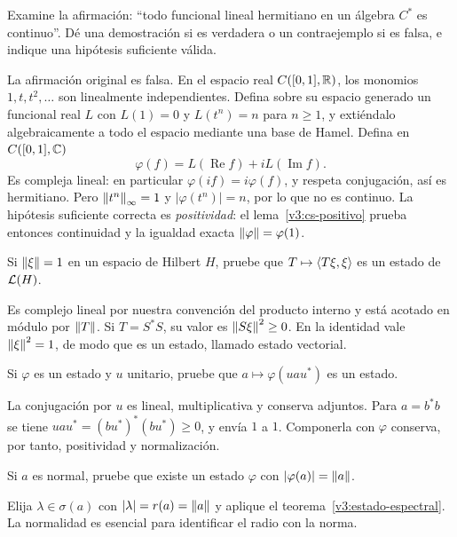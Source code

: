 \begin{ejercicio}\label{ej:v3-l28-1}
Examine la afirmación: ``todo funcional lineal hermitiano en un álgebra $C^*$ es continuo''. Dé una demostración si es verdadera o un contraejemplo si es falsa, e indique una hipótesis suficiente válida.
\end{ejercicio}
\begin{solucion}
La afirmación original es falsa. En el espacio real $C([0,1],\mathbb R)$, los monomios $1,t,t^2,\ldots$ son linealmente independientes. Defina sobre su espacio generado un funcional real $L$ con $L(1)=0$ y $L(t^n)=n$ para $n\ge1$, y extiéndalo algebraicamente a todo el espacio mediante una base de Hamel. Defina en $C([0,1],\mathbb C)$
\[
 \varphi(f)=L(\operatorname{Re}f)+iL(\operatorname{Im}f).
\]
Es compleja lineal: en particular $\varphi(if)=i\varphi(f)$, y respeta conjugación, así es hermitiano. Pero $\left\lVert t^n\right\rVert_\infty=1$ y $|\varphi(t^n)|=n$, por lo que no es continuo. La hipótesis suficiente correcta es \emph{positividad}: el lema~\ref{v3:cs-positivo} prueba entonces continuidad y la igualdad exacta $\left\lVert\varphi\right\rVert=\varphi(1)$.
\end{solucion}

\begin{ejercicio}\label{ej:v3-l28-2}
Si $\left\lVert\xi\right\rVert=1$ en un espacio de Hilbert $H$, pruebe que $T\mapsto\left\langle T\xi,\xi\right\rangle$ es un estado de $\mathcal L(H)$.
\end{ejercicio}
\begin{solucion}
Es complejo lineal por nuestra convención del producto interno y está acotado en módulo por $\left\lVert T\right\rVert$. Si $T=S^*S$, su valor es $\left\lVert S\xi\right\rVert^2\ge0$. En la identidad vale $\left\lVert\xi\right\rVert^2=1$, de modo que es un estado, llamado estado vectorial.
\end{solucion}

\begin{ejercicio}\label{ej:v3-l28-3}
Si $\varphi$ es un estado y $u$ unitario, pruebe que $a\mapsto\varphi(uau^*)$ es un estado.
\end{ejercicio}
\begin{solucion}
La conjugación por $u$ es lineal, multiplicativa y conserva adjuntos. Para $a=b^*b$ se tiene $uau^*=(bu^*)^*(bu^*)\ge0$, y envía $1$ a $1$. Componerla con $\varphi$ conserva, por tanto, positividad y normalización.
\end{solucion}

\begin{ejercicio}\label{ej:v3-l28-4}
Si $a$ es normal, pruebe que existe un estado $\varphi$ con $|\varphi(a)|=\left\lVert a\right\rVert$.
\end{ejercicio}
\begin{solucion}
Elija $\lambda\in\sigma(a)$ con $|\lambda|=r(a)=\left\lVert a\right\rVert$ y aplique el teorema~\ref{v3:estado-espectral}. La normalidad es esencial para identificar el radio con la norma.
\end{solucion}

